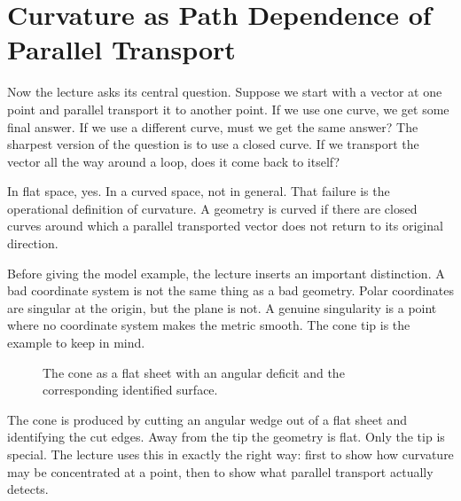 \section{Curvature as Path Dependence of Parallel Transport}

Now the lecture asks its central question. Suppose we start with a vector at one point and parallel transport it to another point. If we use one curve, we get some final answer. If we use a different curve, must we get the same answer? The sharpest version of the question is to use a closed curve. If we transport the vector all the way around a loop, does it come back to itself?

In flat space, yes. In a curved space, not in general. That failure is the operational definition of curvature. A geometry is curved if there are closed curves around which a parallel transported vector does not return to its original direction.

Before giving the model example, the lecture inserts an important distinction. A bad coordinate system is not the same thing as a bad geometry. Polar coordinates are singular at the origin, but the plane is not. A genuine singularity is a point where no coordinate system makes the metric smooth. The cone tip is the example to keep in mind.

\begin{figure}[h]
\centering
{}
\caption{The cone as a flat sheet with an angular deficit and the corresponding identified surface.}
\end{figure}

The cone is produced by cutting an angular wedge out of a flat sheet and identifying the cut edges. Away from the tip the geometry is flat. Only the tip is special. The lecture uses this in exactly the right way: first to show how curvature may be concentrated at a point, then to show what parallel transport actually detects.


